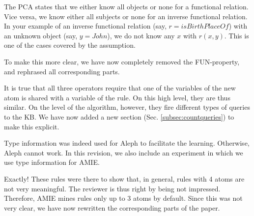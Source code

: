 
The PCA states that we either know all objects or none for a functional relation. Vice versa, we know either all subjects or none for an inverse functional relation. In your example of an inverse functional relation (say, $r=isBirthPlaceOf$) with an unknown object (say, $y=John$), we do not know any $x$ with $r(x,y)$. This is one of the cases covered by the assumption.

To make this more clear, we have now completely removed the FUN-property, and rephrased all corresponding parts.



It is true that all three operators require that one of the variables of the new atom is shared with a variable of the rule. On this high level, they are thus similar. On the level of the algorithm, however, they fire different types of queries to the KB. We have now added a new section (Sec. \ref{subsec:countqueries}) to make this explicit.


      Type information was indeed used for Aleph to facilitate the learning. Otherwise, Aleph cannot work.
      In this revision, we also include an experiment in which we use type information for AMIE.


Exactly! These rules were there to show that, in general, rules with 4 atoms are not very meaningful. The reviewer is thus right by being not impressed. Therefore, AMIE mines rules only up to 3 atoms by default. Since this was not very clear, we have now rewritten the corresponding parts of the paper.

